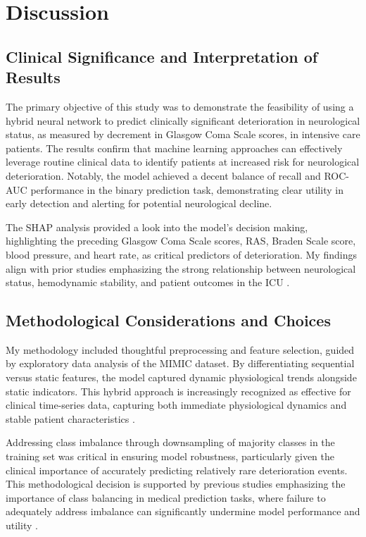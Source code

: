 \documentclass[conference]{IEEEtran}
\begin{document}
\section{Discussion}

\subsection{Clinical Significance and Interpretation of Results}

The primary objective of this study was to demonstrate the feasibility of using a hybrid neural network to predict clinically significant deterioration in neurological status, as measured by decrement in Glasgow Coma Scale scores, in intensive care patients. The results confirm that machine learning approaches can effectively leverage routine clinical data to identify patients at increased risk for neurological deterioration. Notably, the model achieved a decent balance of recall and ROC-AUC performance in the binary prediction task, demonstrating clear utility in early detection and alerting for potential neurological decline.

The SHAP analysis provided a look into the model's decision making, highlighting the preceding Glasgow Coma Scale scores, RAS, Braden Scale score, blood pressure, and heart rate, as critical predictors of deterioration. My findings align with prior studies emphasizing the strong relationship between neurological status, hemodynamic stability, and patient outcomes in the ICU \cite{meyfroidt2009cerebral, cecconi2014consensus}.

\subsection{Methodological Considerations and Choices}

My methodology included thoughtful preprocessing and feature selection, guided by exploratory data analysis of the MIMIC dataset. By differentiating sequential versus static features, the model captured dynamic physiological trends alongside static indicators. This hybrid approach is increasingly recognized as effective for clinical time-series data, capturing both immediate physiological dynamics and stable patient characteristics \cite{harutyunyan2019multitask, lipton2015critical}.

Addressing class imbalance through downsampling of majority classes in the training set was critical in ensuring model robustness, particularly given the clinical importance of accurately predicting relatively rare deterioration events. This methodological decision is supported by previous studies emphasizing the importance of class balancing in medical prediction tasks, where failure to adequately address imbalance can significantly undermine model performance and utility \cite{japkowicz2002class}.
\end{document}
